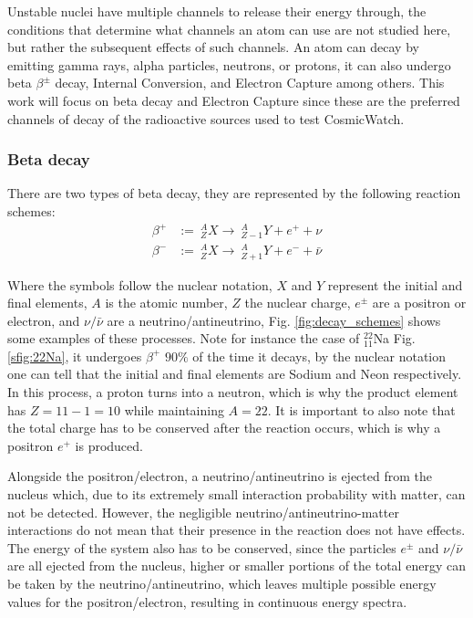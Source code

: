 Unstable nuclei have multiple channels to release their energy through, the conditions that determine what channels an atom can use are not studied here, but rather the subsequent effects of such channels. An atom can decay by emitting gamma rays, alpha particles, neutrons, or protons, it can also undergo beta $\beta^{\pm}$ decay, Internal Conversion, and Electron Capture among others. This work will focus on beta decay and Electron Capture since these are the preferred channels of decay of the radioactive sources used to test CosmicWatch.

\subsubsection{Beta decay} \label{sec:beta_decay}

There are two types of beta decay, they are represented by the following reaction schemes:
\begin{align}
  \beta^+ &:=~ ^A_ZX \rightarrow ~ ^A_{Z-1}Y + e^+ + \nu \\
  \beta^- &:=~ ^A_ZX \rightarrow ~ ^A_{Z+1}Y + e^- + \bar{\nu}
\end{align}

Where the symbols follow the nuclear notation, $X$ and $Y$ represent the initial and final elements, $A$ is the atomic number, $Z$ the nuclear charge, $e^{\pm}$ are a positron or electron, and $\nu/\bar{\nu}$ are a neutrino/antineutrino, Fig. \ref{fig:decay_schemes} shows some examples of these processes. Note for instance the case of $^{22}_{11}$Na Fig. \ref{sfig:22Na}, it undergoes $\beta^+$ $90\%$ of the time it decays, by the nuclear notation one can tell that the initial and final elements are Sodium and Neon respectively. In this process, a proton turns into a neutron, which is why the product element has $Z=11-1=10$ while maintaining $A=22$. It is important to also note that the total charge has to be conserved after the reaction occurs, which is why a positron $e^+$ is produced.

Alongside the positron/electron, a neutrino/antineutrino is ejected from the nucleus which, due to its extremely small interaction probability with matter, can not be detected. However, the negligible neutrino/antineutrino-matter interactions do not mean that their presence in the reaction does not have effects. The energy of the system also has to be conserved, since the particles $e^{\pm}$ and $\nu/\bar{\nu}$ are all ejected from the nucleus, higher or smaller portions of the total energy can be taken by the neutrino/antineutrino, which leaves multiple possible energy values for the positron/electron, resulting in continuous energy spectra.


